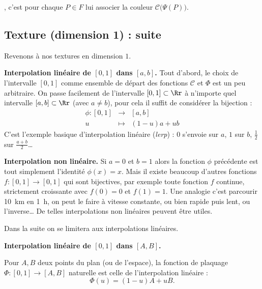 \documentclass[11pt,class=report,crop=false]{standalone}
\begin{document}
, c'est pour chaque $P \in F$ lui associer la couleur $\mathcal{C}\big(\Psi(P)\big)$.



\subsection{Texture (dimension 1) : suite}

Revenons à nos textures en dimension $1$.

\textbf{Interpolation linéaire de $[0,1]$ dans $[a,b]$.}
Tout d'abord, le choix de l'intervalle $[0,1]$ comme ensemble de départ des fonctions $\mathcal{C}$ et $\Phi$ est un peu arbitraire.
On passe facilement de l'intervalle $[0,1] \subset \Rr$ à n'importe quel intervalle $[a,b] \subset \Rr$ (avec $a \neq b$), pour cela il suffit de considérer la bijection :
$$  \begin{array}{rcl}
	\phi : [0,1] & \longrightarrow & [a,b] \\
	u & \longmapsto & (1-u)a + u b
\end{array}
$$ 
C'est l'exemple basique d'interpolation linéaire (\emph{lerp}) : $0$ s'envoie sur $a$, $1$ sur $b$, $\frac12$ sur $\frac{a+b}{2}$\ldots




\textbf{Interpolation non linéaire.}
Si $a=0$ et $b=1$ alors la fonction $\phi$ précédente est tout simplement l'identité $\phi(x)=x$.
Mais il existe beaucoup d'autres fonctions $f : [0,1] \to [0,1]$ qui sont bijectives, 
par exemple toute fonction $f$ continue, strictement croissante avec $f(0)=0$ et $f(1)=1$.
Une analogie c'est parcourir \SI{10}{\kilo\meter} en \SI{1}{\hour}, on peut le faire à vitesse constante, ou bien rapide puis lent, ou l'inverse\ldots{}
De telles interpolations non linéaires peuvent être utiles. 

Dans la suite on se limitera aux interpolations linéaires.

\textbf{Interpolation linéaire de $[0,1]$ dans $[A,B]$.}

Pour $A,B$ deux points du plan (ou de l'espace), la fonction de plaquage $\Phi : [0,1] \to [A,B]$ naturelle est celle de l'interpolation linéaire :
$$\Phi(u) = (1-u) A + u B.$$


\end{document}
